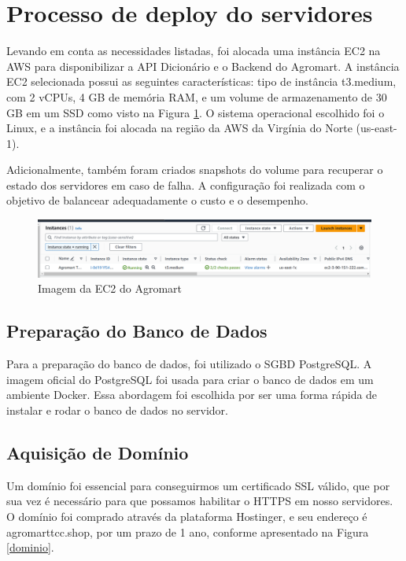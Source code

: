 \section{Processo de deploy do servidores}
Levando em conta as necessidades listadas, foi alocada uma instância EC2 na AWS para disponibilizar a API Dicionário e o Backend do Agromart. A instância EC2 selecionada possui as seguintes características: tipo de instância t3.medium, com 2 vCPUs, 4 GB de memória RAM, e um volume de armazenamento de 30 GB em um SSD como visto na Figura \ref{ec2}. O sistema operacional escolhido foi o Linux, e a instância foi alocada na região da AWS da Virgínia do Norte (us-east-1).

Adicionalmente, também foram criados snapshots do volume para recuperar o estado dos servidores em caso de falha. A configuração foi realizada com o objetivo de balancear adequadamente o custo e o desempenho.

\begin{figure}[h]
        \centering
        \includegraphics[keepaspectratio=true,scale=0.3]{figuras/ec2_agromart.png}
        \caption{Imagem da EC2 do Agromart}
        \label{ec2}
\end{figure}

\subsection{Preparação do Banco de Dados}
Para a preparação do banco de dados, foi utilizado o SGBD PostgreSQL. A imagem oficial do PostgreSQL foi usada para criar o banco de dados em um ambiente Docker. Essa abordagem foi escolhida por ser uma forma rápida de instalar e rodar o banco de dados no servidor.

\subsection{Aquisição de Domínio}
Um domínio foi essencial para conseguirmos um certificado SSL válido, que por sua vez é necessário para que possamos habilitar o HTTPS em nosso servidores. O domínio foi comprado através da plataforma Hostinger, e seu endereço é agromarttcc.shop, por um prazo de 1 ano, conforme apresentado na Figura \ref{dominio}. 

